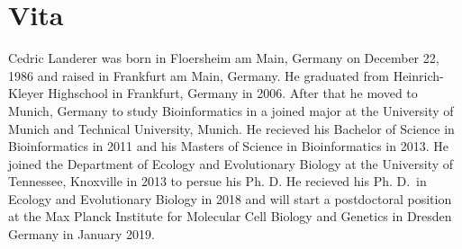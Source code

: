 \chapter*{Vita} \label{ch:vita}
Cedric Landerer was born in Floersheim am Main, Germany on December 22, 1986 and raised in Frankfurt am Main, Germany.
He graduated from Heinrich-Kleyer Highschool in Frankfurt, Germany in 2006.
After that he moved to Munich, Germany to study Bioinformatics in a joined major at the University of Munich and Technical University, Munich.
He recieved his Bachelor of Science in Bioinformatics in 2011 and his Masters of Science in Bioinformatics in 2013.
He joined the Department of Ecology and Evolutionary Biology at the University of Tennessee, Knoxville in 2013 to persue his Ph. D. 
He recieved his Ph. D.~in Ecology and Evolutionary Biology in 2018 and will start a postdoctoral position at the Max Planck Institute for Molecular Cell Biology and Genetics in Dresden Germany in January 2019.